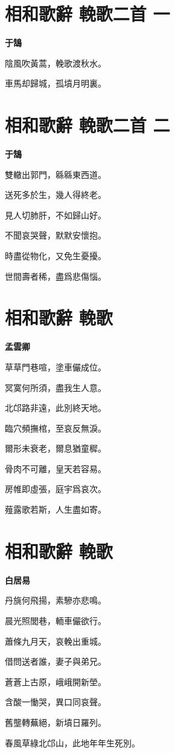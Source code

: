 \documentclass[12pt,a4paper]{ctexbook}
\begin{document}
\section{相和歌辭 輓歌二首 一}
\textbf{于鵠}\par\vspace{0.5em}
陰風吹黃蒿，輓歌渡秋水。\par
車馬却歸城，孤墳月明裏。\par

\section{相和歌辭 輓歌二首 二}
\textbf{于鵠}\par\vspace{0.5em}
雙轍出郭門，緜緜東西道。\par
送死多於生，幾人得終老。\par
見人切肺肝，不如歸山好。\par
不聞哀哭聲，默默安懷抱。\par
時盡從物化，又免生憂擾。\par
世間壽者稀，盡爲悲傷惱。\par

\section{相和歌辭 輓歌}
\textbf{孟雲卿}\par\vspace{0.5em}
草草門巷喧，塗車儼成位。\par
冥寞何所須，盡我生人意。\par
北邙路非遠，此別終天地。\par
臨穴頻撫棺，至哀反無淚。\par
爾形未衰老，爾息猶童穉。\par
骨肉不可離，皇天若容易。\par
房帷即虛張，庭宇爲哀次。\par
薤露歌若斯，人生盡如寄。\par

\section{相和歌辭 輓歌}
\textbf{白居易}\par\vspace{0.5em}
丹旐何飛揚，素驂亦悲鳴。\par
晨光照閭巷，輀車儼欲行。\par
蕭條九月天，哀輓出重城。\par
借問送者誰，妻子與弟兄。\par
蒼蒼上古原，峨峨開新塋。\par
含酸一慟哭，異口同哀聲。\par
舊壟轉蕪絕，新墳日羅列。\par
春風草綠北邙山，此地年年生死別。\par
\end{document}
